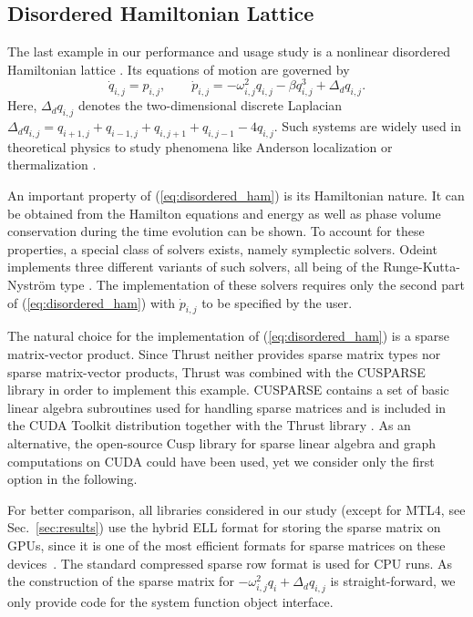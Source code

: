 \documentclass[final]{siamltex}
\newcommand{\eqref}[1]{(\ref{#1})}
\begin{document}
%
%
\subsection{Disordered Hamiltonian Lattice}


The last example in our performance and usage study is a
nonlinear disordered Hamiltonian lattice \cite{mulansky_scaling_2012}. Its
equations of motion are governed by
\begin{equation}
\dot{q}_{i,j} = p_{i,j}, \quad \quad
\dot{p}_{i,j} = - \omega_{i,j}^2 q_{i,j} - \beta q_{i,j}^3 + \Delta_d q_{i,j}.
\label{eq:disordered_ham}
\end{equation}
Here, $\Delta_d q_{i,j}$ denotes the two-dimensional discrete Laplacian
$\Delta_d
q_{i,j}=q_{i+1,j}+q_{i-1,j}+q_{i,j+1}+q_{i,j-1}-4q_{i,j}$. Such
systems are widely used in theoretical physics to study phenomena
like Anderson localization \cite{Sheng-06} or thermalization \cite{FPUScholarpedia}.

An important property of \eqref{eq:disordered_ham} is its Hamiltonian
nature. It can be obtained from the Hamilton equations and energy as well as phase volume conservation during the time
evolution can be shown. To account for these properties, a special class of solvers
exists, namely symplectic solvers. Odeint implements three different
variants of such solvers, all being of the Runge-Kutta-Nystr\"om
type \cite{HairerGeometricNumericalIntegration2006,Leimkuhler-Reich-04}. The
implementation of these solvers requires only the second part
of \eqref{eq:disordered_ham} with $\dot{p}_{i,j}$ to be specified by
the user.



The natural choice for the implementation of \eqref{eq:disordered_ham} is a
sparse matrix-vector product. Since Thrust neither provides sparse matrix
types nor sparse matrix-vector products, Thrust was combined with the
CUSPARSE library in order to implement this example. CUSPARSE contains a set of
basic linear algebra subroutines used for handling sparse matrices and is
included in the CUDA Toolkit distribution together with the Thrust library
\cite{NvidiaCusparseManual}. As an alternative, the open-source Cusp library
\cite{CuspRef} for sparse linear algebra and graph computations on CUDA could
have been used, yet we consider only the first option in the following.


For better comparison, all libraries considered in our study (except for MTL4,
see Sec.~\ref{sec:results}) use the hybrid ELL format for storing the sparse
matrix on GPUs, since it is one of the most efficient formats for sparse
matrices on these devices~\cite{BellGarland2008}. The standard compressed
sparse row format is used for CPU runs.  As the construction of the sparse
matrix for $- \omega_{i,j}^2 q_i + \Delta_d q_{i,j}$ is straight-forward, we
only provide code for the system function object interface.
\end{document}
